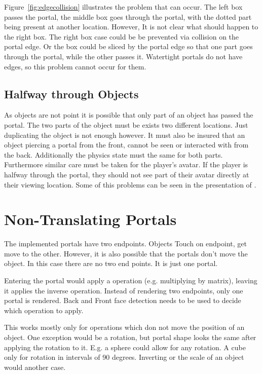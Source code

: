 Figure~\ref{fig:edgecollision} illustrates the problem that can occur. The left box passes the portal, the middle box goes through the portal, with the dotted  part being present at another location. However, It is not clear what should happen to the right box. The right box case could be  be prevented via collision on the portal edge. Or the box could be sliced by the portal edge so that one part goes through the portal, while the other passes it. Watertight portals do not have edges, so this problem cannot occur for them.

\subsection{Halfway through Objects}
As objects are not point it is possible that only part of an object has passed the portal. The two parts of the object must be exists two different locations. Just duplicating the object is not enough however. It must also be insured that an object piercing a portal from the front, cannot be seen or interacted with from the back. Additionally the physics state must the same for both parts. Furthermore similar care must be taken for the player's avatar. If the player is halfway through the portal, they should not see part of their avatar directly at their viewing location. Some of this problems can be seen in the presentation of \textcite{lecture:portalProblems}.


\section{Non-Translating Portals}
The implemented portals have two endpoints. Objects Touch on endpoint, get move to the other. However, it is also possible that the portals don't move the object. In this case there are no two end points. It is just one portal.

Entering the portal would apply a operation (e.g. multiplying by matrix), leaving it applies the inverse operation. Instead of rendering two endpoints, only one portal is rendered. Back and Front face detection needs to be used to decide which operation to apply.

This works mostly only for operations which don not move the position of an object. One exception would be a rotation, but portal shape looks the same after applying the rotation to it. E.g. a sphere could allow for any rotation. A cube only for rotation in intervals of 90 degrees. Inverting or the scale of an object would another case.



